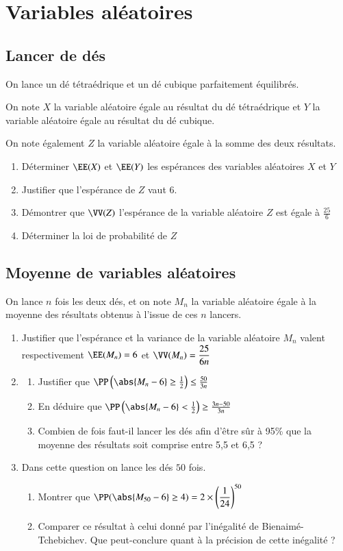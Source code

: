 \documentclass[oneside,12pt]{article}
\let\oldsection\section
\renewcommand{\section}{\newpage\oldsection}
\begin{document}
\section{Variables aléatoires}
\subsection{Lancer de dés}
On lance un dé tétraédrique et un dé cubique parfaitement équilibrés.

On note $X$ la variable aléatoire égale au résultat du dé tétraédrique et $Y$ la variable aléatoire égale au résultat du dé cubique.

On note également $Z$ la variable aléatoire égale à la somme des deux résultats.
\begin{enumerate}
    \item Déterminer $\EE(X)$ et $\EE(Y)$ les espérances des variables aléatoires $X$ et $Y$
    \item Justifier que l'espérance de $Z$ vaut $6$.
    \item Démontrer que $\VV(Z)$ l'espérance de la variable aléatoire $Z$ est égale à $\frac{25}{6}$
    \item Déterminer la loi de probabilité de $Z$
\end{enumerate}

\subsection{Moyenne de variables aléatoires}
On lance $n$ fois les deux dés, et on note $M_n$ la variable aléatoire égale à la moyenne des résultats obtenus à l'issue de ces $n$ lancers.
\begin{enumerate}
    \item Justifier que l'espérance et la variance de la variable aléatoire $M_n$ valent respectivement $\EE(M_n)=6$ et $\VV(M_n)=\dfrac{25}{6n}$

    \item \begin{enumerate}
        \item Justifier que $\PP\left(\abs{M_n-6}\geq\frac{1}{2}\right)\leq\frac{50}{3n}$
        \item En déduire que $\PP\left(\abs{M_n-6}<\frac{1}{2}\right)\geq\frac{3n-50}{3n}$
        \item Combien de fois faut-il lancer les dés afin d'être sûr à 95\% que la moyenne des résultats soit comprise entre 5,5 et 6,5 ?
    \end{enumerate}
    \item Dans cette question on lance les dés $50$ fois.
    \begin{enumerate}
        \item Montrer que $\PP(\abs{M_{50}-6}\geq4)=2\times\left(\dfrac{1}{24}\right)^{50}$
        \item Comparer ce résultat à celui donné par l'inégalité de Bienaimé-Tchebichev. Que peut-conclure quant à la précision de cette inégalité ?
    \end{enumerate}
\end{enumerate}
\end{document}
